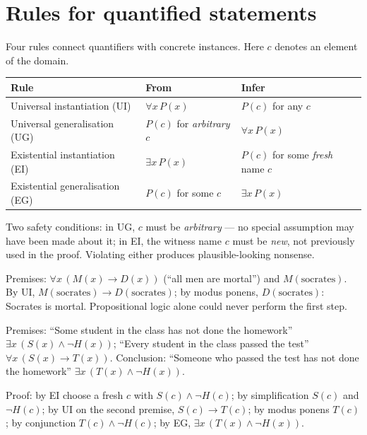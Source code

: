 \section{Rules for quantified statements}

Four rules connect quantifiers with concrete instances. Here $c$ denotes an
element of the domain.

\begin{center}
\renewcommand{\arraystretch}{1.5}
\begin{tabular}{lll}
\toprule
\textbf{Rule} & \textbf{From} & \textbf{Infer}\\
\midrule
Universal instantiation (UI) & $\forall x\,P(x)$ & $P(c)$ for any $c$\\
Universal generalisation (UG) & $P(c)$ for \emph{arbitrary} $c$ &
  $\forall x\,P(x)$\\
Existential instantiation (EI) & $\exists x\,P(x)$ &
  $P(c)$ for some \emph{fresh} name $c$\\
Existential generalisation (EG) & $P(c)$ for some $c$ & $\exists x\,P(x)$\\
\bottomrule
\end{tabular}
\end{center}

\begin{notebox}
Two safety conditions: in UG, $c$ must be \emph{arbitrary} --- no special
assumption may have been made about it; in EI, the witness name $c$ must be
\emph{new}, not previously used in the proof. Violating either produces
plausible-looking nonsense.
\end{notebox}

\begin{example}[Socrates]
Premises: $\forall x\,(M(x) \to D(x))$ (``all men are mortal'') and
$M(\mathrm{socrates})$. By UI, $M(\mathrm{socrates}) \to
D(\mathrm{socrates})$; by modus ponens, $D(\mathrm{socrates})$:
Socrates is mortal. Propositional logic alone could never perform the first
step.
\end{example}

\begin{example}\label{ex:exist}
Premises: ``Some student in the class has not done the homework''
$\exists x\,(S(x) \wedge \neg H(x))$; ``Every student in the class passed the
test'' $\forall x\,(S(x) \to T(x))$. Conclusion: ``Someone who passed the test
has not done the homework'' $\exists x\,(T(x) \wedge \neg H(x))$.

Proof: by EI choose a fresh $c$ with $S(c) \wedge \neg H(c)$; by
simplification $S(c)$ and $\neg H(c)$; by UI on the second premise,
$S(c) \to T(c)$; by modus ponens $T(c)$; by conjunction
$T(c) \wedge \neg H(c)$; by EG, $\exists x\,(T(x) \wedge \neg H(x))$.
\end{example}

